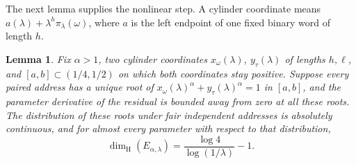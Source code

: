 \documentclass[11pt,a4paper]{amsart}
\numberwithin{equation}{section}
\newtheorem{lemma}[theorem]{Lemma}
\theoremstyle{definition}
\begin{document}
The next lemma supplies the nonlinear step. A cylinder coordinate
means \(a(\lambda)+\lambda^h\pi_\lambda(\omega)\), where \(a\)
is the left endpoint of one fixed binary word of length \(h\).

\begin{lemma}\label{lem:root-fibres}
Fix \(\alpha>1\), two cylinder coordinates \(x_\omega(\lambda)\),
\(y_\tau(\lambda)\) of lengths \(h,\ell\), and
\([a,b]\subset(1/4,1/2)\) on which both coordinates stay positive.
Suppose every paired address has a unique root of
\(x_\omega(\lambda)^\alpha+y_\tau(\lambda)^\alpha=1\) in \([a,b]\),
and the parameter derivative of the residual is bounded away
from zero at all these roots.
The distribution of these roots under fair independent addresses
is absolutely continuous, and for almost every parameter with
respect to that distribution,
\[
\dim_{\mathrm H}(E_{\alpha,\lambda})=\frac{\log4}{\log(1/\lambda)}-1.
\]
\end{lemma}
\end{document}
